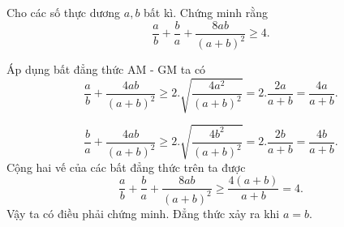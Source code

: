 \begin{problem}
	Cho các số thực dương $a, b$ bất kì. Chứng minh rằng
	\[
		\frac{a}{b} + \frac{b}{a} + \frac{8ab}{(a + b)^2} \ge 4.
	\]
	\solution

	Áp dụng bất đẳng thức AM - GM ta có
	\[
		\frac{a}{b} + \frac{4ab}{(a + b)^2} \ge 2.\sqrt{\frac{4a^2}{(a + b)^2}}
		= 2.\frac{2a}{a + b} = \frac{4a}{a + b}.
	\]

	\[
		\frac{b}{a} + \frac{4ab}{(a + b)^2} \ge 2.\sqrt{\frac{4b^2}{(a + b)^2}}
		= 2.\frac{2b}{a + b} = \frac{4b}{a + b}.
	\]
	Cộng hai vế của các bất đẳng thức trên ta được
	\[
		\frac{a}{b} + \frac{b}{a} + \frac{8ab}{(a + b)^2} \ge \frac{4(a + b)}{a + b} = 4.
	\]
	Vậy ta có điều phải chứng minh. Đẳng thức xảy ra khi $a = b$.
\end{problem}